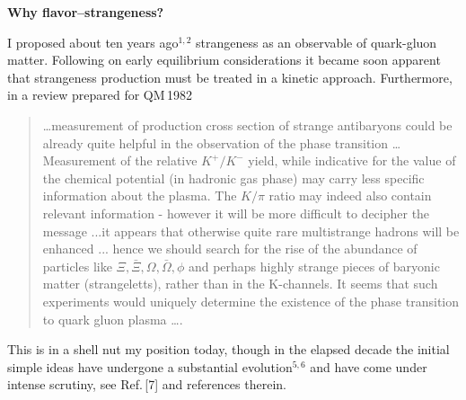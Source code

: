 \begin{mdframed}[linecolor=gray,roundcorner=12pt,backgroundcolor=Dandelion!15,linewidth=1pt,leftmargin=0cm,rightmargin=0cm,topline=true,bottomline=true,skipabove=12pt]
\textbf{\large   Why flavor--strangeness?}\\[0.1cm]
I proposed about ten years ago$^{1,2}$  strangeness as an
observable of quark-gluon matter. Following on early equilibrium
considerations it became
soon apparent that strangeness production must be treated in a kinetic
approach\footnotemark[3]. Furthermore, in a review prepared for QM\,1982\footnotemark[4] 
\begin{quote}
\ldots measurement of production cross section of strange antibaryons could be already quite helpful in the observation of the phase transition \ldots\\ Measurement of the relative $K^+/K^-$ yield, while indicative for the value of the chemical potential (in hadronic gas phase) may carry less specific information about the plasma. The $K/\pi$ ratio may indeed also contain relevant information - however it will be more difficult to decipher the message ...it appears that otherwise quite rare multistrange hadrons will be enhanced ... hence we should search for the rise of the abundance of particles like $\Xi, {\bar \Xi}, \Omega, {\bar \Omega}, \phi$ and perhaps highly strange pieces of baryonic matter (strangeletts), rather than in the K-channels. It seems that such experiments would uniquely determine the existence of the phase transition to quark gluon plasma \ldots.
\end{quote}
This is in a shell nut my position today, though in the elapsed decade the initial simple ideas have undergone a substantial evolution$^{5,6}$ and have come under intense scrutiny, see Ref.\,[7] and references therein.


\end{mdframed}
